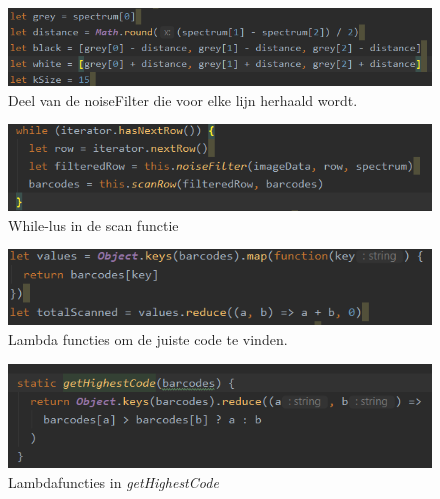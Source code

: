 \documentclass[a4paper,11pt]{article}
\begin{document}
\begin{figure}
	\centering
	\includegraphics{img/noiseFilter}
	\caption{Deel van de noiseFilter die voor elke lijn herhaald wordt.}
	\label{noiseFilter}
\end{figure}

\begin{figure}
	\centering
	\includegraphics{img/startFilter}
	\caption{While-lus in de scan functie}
	\label{startFilter}
\end{figure}
\begin{figure}
	\centering
	\includegraphics{img/lambda}
	\caption{Lambda functies om de juiste code te vinden.}
	\label{lambda}
\end{figure}
\begin{figure}
	\centering
	\includegraphics{img/getHighestCode}
	\caption{Lambdafuncties in {\it getHighestCode}}
	\label{getHighestCode}
\end{figure}
\end{document}
